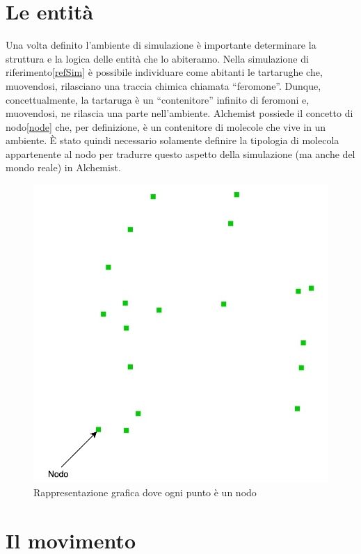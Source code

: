 \section{Le entità}
Una volta definito l'ambiente di simulazione è importante determinare la struttura e la logica delle 
entità che lo abiteranno. Nella simulazione di riferimento\space\ref{refSim} è possibile individuare come abitanti le tartarughe
che, muovendosi, rilasciano una traccia chimica chiamata ``feromone''. Dunque, concettualmente, la tartaruga è un ``contenitore'' infinito di 
feromoni e, muovendosi, ne rilascia una parte nell'ambiente. Alchemist possiede il concetto di nodo\space\ref{node} che, per definizione, 
è un contenitore di molecole che vive in un ambiente. È stato quindi necessario solamente definire la tipologia di molecola
appartenente al nodo per tradurre questo aspetto della simulazione (ma anche del mondo reale) in Alchemist.
\begin{figure}[h!]
    \centering
    \includegraphics[width=.7\linewidth]{figures/nodes.png}
    \caption{Rappresentazione grafica dove ogni punto è un nodo}\label{fig:nodes}
\end{figure}
\clearpage
\section{Il movimento}

